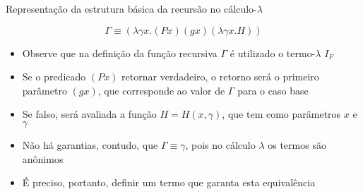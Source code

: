 \begin{frame}[fragile]{Representação da estrutura básica da recursão no cálculo-$\lambda$}

    \begin{huge}
    \[
        \Gamma\equiv (\lambda \gamma x.(Px)(gx)(\lambda \gamma x.H))
    \]
    \end{huge}

    \begin{itemize}
        \item Observe que na definição da função recursiva $\Gamma$ é utilizado o 
            termo-$\lambda$ $I_F$

        \item Se o predicado $(Px)$ retornar verdadeiro, o retorno será o primeiro parâmetro 
            $(gx)$, que corresponde ao valor de $\Gamma$ para o caso base

        \item Se falso, será avaliada a função $H = H(x, \gamma)$, que tem como parâmetros $x$ 
            e $\gamma$

        \item Não há garantias, contudo, que $\Gamma\equiv \gamma$, pois no cálculo $\lambda$ 
            os termos são anônimos

        \item É preciso, portanto, definir um termo que garanta esta equivalência
    \end{itemize}
\end{frame}
